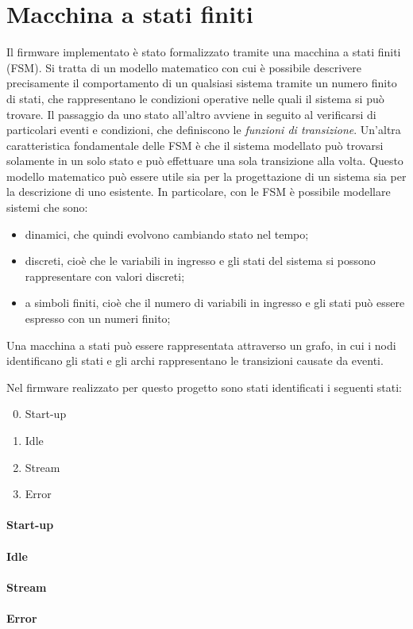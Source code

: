 \section{Macchina a stati finiti}
Il firmware implementato è stato formalizzato tramite una macchina a stati finiti (FSM). Si tratta di un modello matematico con cui è possibile descrivere precisamente il comportamento di un qualsiasi sistema tramite un numero finito di stati, che rappresentano le condizioni operative nelle quali il sistema si può trovare. Il passaggio da uno stato all'altro avviene in seguito al verificarsi di particolari eventi e condizioni, che definiscono le \textit{funzioni di transizione}. Un'altra caratteristica fondamentale delle FSM è che il sistema modellato può trovarsi solamente in un solo stato e può effettuare una sola transizione alla volta.
Questo modello matematico può essere utile sia per la progettazione di un sistema sia per la descrizione di uno esistente. In particolare, con le FSM è possibile modellare sistemi che sono:
\begin{itemize}
	\item dinamici, che quindi evolvono cambiando stato nel tempo;
	\item discreti, cioè che le variabili in ingresso e gli stati del sistema si possono rappresentare con valori discreti;
	\item a simboli finiti, cioè che il numero di variabili in ingresso e gli stati può essere espresso con un numeri finito;
\end{itemize}
Una macchina a stati può essere rappresentata attraverso un grafo, in cui i nodi identificano gli stati e gli archi rappresentano le transizioni causate da eventi. 

Nel firmware realizzato per questo progetto sono stati identificati i seguenti stati:
\begin{enumerate}
	\setcounter{enumi}{-1}
	\item Start-up
	\item Idle
	\item Stream
	\item Error
\end{enumerate}


\paragraph{Start-up}
\paragraph{Idle}
\paragraph{Stream}
\paragraph{Error}

\clearpage